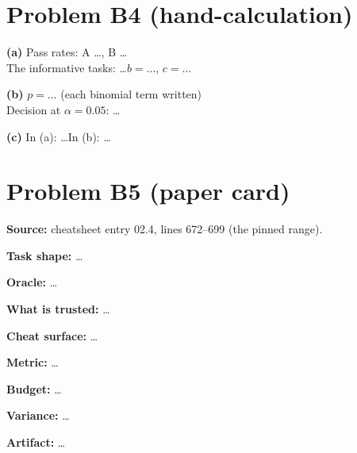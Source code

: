 \documentclass[11pt]{article}
\begin{document}
\section*{Problem B4 (hand-calculation)}\label{ans:B4}
\begin{answer}
\textbf{(a)} Pass rates: A \dots, B \dots \\
The informative tasks: \dots \quad $b = \dots$, $c = \dots$

\textbf{(b)} $p = \dots$ (each binomial term written) \\
Decision at $\alpha = 0.05$: \dots

\textbf{(c)} In (a): \dots \quad In (b): \dots
\end{answer}

\section*{Problem B5 (paper card)}\label{ans:B5}
\begin{answer}
\textbf{Source:} cheatsheet entry 02.4, lines 672--699 (the pinned range).

\textbf{Task shape:} \dots

\textbf{Oracle:} \dots

\textbf{What is trusted:} \dots

\textbf{Cheat surface:} \dots

\textbf{Metric:} \dots

\textbf{Budget:} \dots

\textbf{Variance:} \dots

\textbf{Artifact:} \dots
\end{answer}
\end{document}
